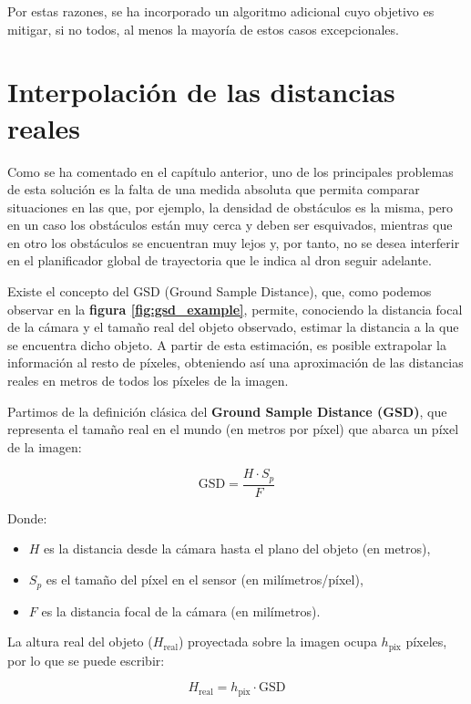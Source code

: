 Por estas razones, se ha incorporado un algoritmo adicional cuyo objetivo es mitigar, si no todos, al menos la mayoría de estos casos excepcionales.

    \section{Interpolación de las distancias reales}
Como se ha comentado en el capítulo anterior, uno de los principales problemas de esta solución es la falta de una medida absoluta que permita comparar situaciones en las que, por ejemplo, la densidad de obstáculos es la misma, pero en un caso los obstáculos están muy cerca y deben ser esquivados, mientras que en otro los obstáculos se encuentran muy lejos y, por tanto, no se desea interferir en el planificador global de trayectoria que le indica al dron seguir adelante.

Existe el concepto del GSD (Ground Sample Distance), que, como podemos observar en la \textbf{figura \ref{fig:gsd_example}}, permite, conociendo la distancia focal de la cámara y el tamaño real del objeto observado, estimar la distancia a la que se encuentra dicho objeto. A partir de esta estimación, es posible extrapolar la información al resto de píxeles, obteniendo así una aproximación de las distancias reales en metros de todos los píxeles de la imagen.

Partimos de la definición clásica del \textbf{Ground Sample Distance (GSD)}, que representa el tamaño real en el mundo (en metros por píxel) que abarca un píxel de la imagen:

\begin{equation}
\text{GSD} = \frac{H \cdot S_p}{F}
\end{equation}

Donde:
\begin{itemize}
  \item $H$ es la distancia desde la cámara hasta el plano del objeto (en metros),
  \item $S_p$ es el tamaño del píxel en el sensor (en milímetros/píxel),
  \item $F$ es la distancia focal de la cámara (en milímetros).
\end{itemize}

La altura real del objeto ($H_{\text{real}}$) proyectada sobre la imagen ocupa $h_{\text{pix}}$ píxeles, por lo que se puede escribir:

\begin{equation}
H_{\text{real}} = h_{\text{pix}} \cdot \text{GSD}
\end{equation}

